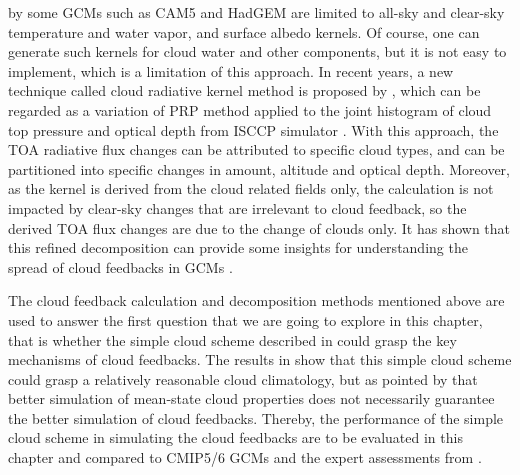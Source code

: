 by some GCMs such as CAM5 \citep{Pendergrass2018} and HadGEM \citep{Smith2020} are limited to all-sky and clear-sky temperature and water vapor, and surface albedo kernels. Of course, one can generate such kernels for cloud water and other components, but it is not easy to implement, which is a limitation of this approach. In recent years, a new technique called cloud radiative kernel method is proposed by \cite{Zelinka2012computing1,Zelinka2012computing2}, which can be regarded as a variation of PRP method applied to the joint histogram of cloud top pressure and optical depth from ISCCP simulator \citep{Klein1999validation,Webb2001combining}. With this approach, the TOA radiative flux changes can be attributed to specific cloud types, and can be partitioned into specific changes in amount, altitude and optical depth. Moreover, as the kernel is derived from the cloud related fields only, the calculation is not impacted by clear-sky changes that are irrelevant to cloud feedback, so the derived TOA flux changes are due to the change of clouds only. It has shown that this refined decomposition can provide some insights for understanding the spread of cloud feedbacks in GCMs \citep[e.g.,][]{Zelinka2016insights,Zelinka2020causes,Zelinka2021evaluating}.

The cloud feedback calculation and decomposition methods mentioned above are used to answer the first question that we are going to explore in this chapter, that is whether the simple cloud scheme described in  could grasp the key mechanisms of cloud feedbacks. The results in  show that this simple cloud scheme could grasp a relatively reasonable cloud climatology, but as pointed by \cite{Zelinka2021evaluating} that better simulation of mean-state cloud properties does not necessarily guarantee the better simulation of cloud feedbacks. Thereby, the performance of the simple cloud scheme in simulating the cloud feedbacks are to be evaluated in this chapter and compared to CMIP5/6 GCMs and the expert assessments from \cite{Sherwood2020}. 

